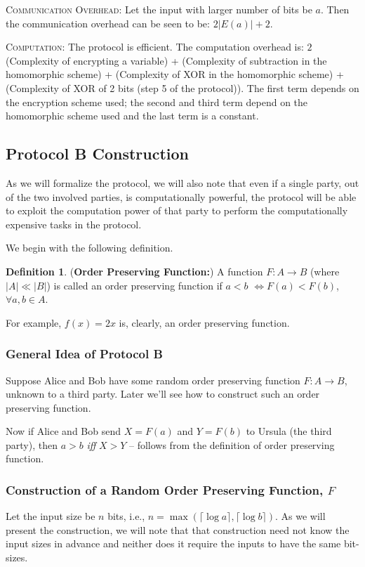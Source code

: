 \documentclass[11pt, letterpaper, romanappendices, onecolumn]{article}
\theoremstyle{plain}\newtheorem{thm}{Theorem}[section]
\theoremstyle{definition}
\newtheorem{defn}{Definition}[section]
\theoremstyle{remark}
\begin{document}
\par \textsc{Communication Overhead}: Let the input with larger number of bits be $a$. Then the communication overhead can be seen to be: $2|E(a)| + 2$.

\par \textsc{Computation}: The protocol is efficient. The computation overhead is: $2$(Complexity of encrypting a variable) + (Complexity of subtraction in the homomorphic scheme) + (Complexity of XOR in the homomorphic scheme) + (Complexity of XOR of 2 bits (step 5 of the protocol)). The first term depends on the encryption scheme used; the second and third term depend on the homomorphic scheme used and the last term is a constant.

\subsection{Protocol \textsf{B} Construction}
As we will formalize the protocol, we will also note that even if a single party, out of the two involved parties, is computationally powerful, the protocol will be able to exploit the computation power of that party to perform the computationally expensive tasks in the protocol.
\par We begin with the following definition.
\begin{defn}
(\textbf{Order Preserving Function:}) A function $F: A\rightarrow B$ (where $|A| \ll |B|$) is called an order preserving function if $a < b$ $\Longleftrightarrow F(a) < F(b)$, $\forall a, b \in A$.
\end{defn}
For example, $f(x) = 2x$ is, clearly, an order preserving function.
\newline

\subsubsection{General Idea of Protocol \textsf{B}}
\par Suppose Alice and Bob have some random order preserving function $F: A\rightarrow B$, unknown to a third party. Later we'll see how to construct such an order preserving function.

\par Now if Alice and Bob send $X = F(a)$ and $Y = F(b)$ to Ursula (the third party), then $a > b$ \textit{iff} $X > Y$ -- follows from the definition of order preserving function.
\newline

\subsubsection{Construction of a Random Order Preserving Function, $F$}
\par Let the input size be $n$ bits, i.e., $n = \max(\lceil \log a \rceil, \lceil \log b \rceil)$. As we will present the construction, we will note that that construction need not know the input sizes in advance and neither does it
require the inputs to have the same bit-sizes.
\end{document}
